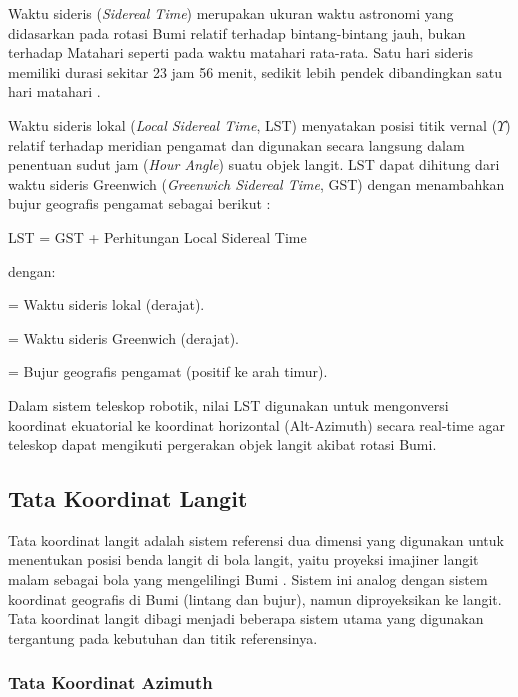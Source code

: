 Waktu sideris (\textit{Sidereal Time}) merupakan ukuran waktu astronomi yang didasarkan pada rotasi Bumi relatif terhadap bintang-bintang jauh, bukan terhadap Matahari seperti pada waktu matahari rata-rata. Satu hari sideris memiliki durasi sekitar 23 jam 56 menit, sedikit lebih pendek dibandingkan satu hari matahari \cite{Meeus1998}. 

Waktu sideris lokal (\textit{Local Sidereal Time}, LST) menyatakan posisi titik vernal ($\Upsilon$) relatif terhadap meridian pengamat dan digunakan secara langsung dalam penentuan sudut jam (\textit{Hour Angle}) suatu objek langit. LST dapat dihitung dari waktu sideris Greenwich (\textit{Greenwich Sidereal Time}, GST) dengan menambahkan bujur geografis pengamat sebagai berikut \cite{Meeus1998}:

\begin{equationcaptioned}[eq:2.lst]{
		LST = GST + \lambda
	}{
		Perhitungan Local Sidereal Time
	}
\end{equationcaptioned}

dengan:
\begin{description}[noitemsep]
	\item[$LST$] = Waktu sideris lokal (derajat).
	\item[$GST$] = Waktu sideris Greenwich (derajat).
	\item[$\lambda$] = Bujur geografis pengamat (positif ke arah timur).
\end{description}

Dalam sistem teleskop robotik, nilai LST digunakan untuk mengonversi koordinat ekuatorial ke koordinat horizontal (Alt-Azimuth) secara real-time agar teleskop dapat mengikuti pergerakan objek langit akibat rotasi Bumi.


\subsection{Tata Koordinat Langit} \label{II.Teori4}
Tata koordinat langit adalah sistem referensi dua dimensi yang digunakan untuk menentukan posisi benda langit di bola langit, yaitu proyeksi imajiner langit malam sebagai bola yang mengelilingi Bumi \cite{Roy2018} \cite{HannuKarttunen2017} \cite{Bradley2014}. Sistem ini analog dengan sistem koordinat geografis di Bumi (lintang dan bujur), namun diproyeksikan ke langit. Tata koordinat langit dibagi menjadi beberapa sistem utama yang digunakan tergantung pada kebutuhan dan titik referensinya.
\subsubsection{Tata Koordinat Azimuth} \label{II.Teori4.1}


